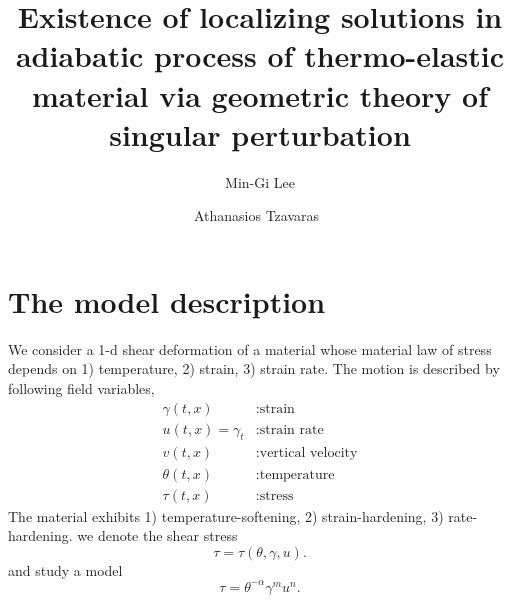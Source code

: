 \documentclass[a4paper,11pt]{article}
\begin{document}
\title{Existence of localizing solutions in adiabatic process of thermo-elastic material via geometric theory of singular perturbation}
\author{Min-Gi Lee\footnotemark[1] \and Athanasios Tzavaras\footnotemark[1]\  \footnotemark[3]  \footnotemark[4]}
\date{}

\maketitle
\renewcommand{\thefootnote}{\fnsymbol{footnote}}
\renewcommand{\thefootnote}{\arabic{footnote}}


\maketitle

\tableofcontents

\section{The model description}
We consider a 1-d shear deformation of a material whose material law of stress depends on 1) temperature, 2) strain, 3) strain rate. The motion is described by following field variables,
\begin{equation} \label{eq:vars}
\begin{aligned}
 \gamma(t,x) &: \text{strain}\\
 u(t,x)=\gamma_t &: \text{strain rate}\\
 v(t,x) &: \text{vertical velocity}\\
 \theta(t,x) &: \text{temperature}\\
 \tau(t,x) &: \text{stress}
\end{aligned}
\end{equation}
The material exhibits 1) temperature-softening, 2) strain-hardening, 3) rate-hardening. we denote the shear stress
$$ \tau = \tau(\theta,\gamma,u). $$
and study a model
\begin{equation}
 \tau = \theta^{-\alpha}\gamma^m u^n. \label{eq:stresslaw}
\end{equation}
\end{document}
